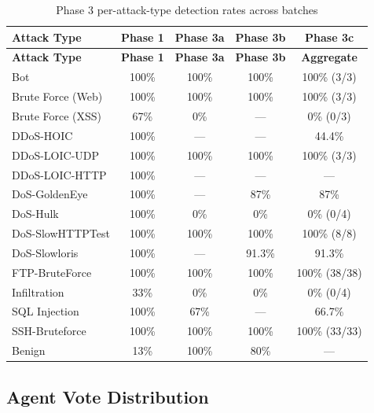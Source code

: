 \documentclass[12pt, a4paper, oneside]{report}
\begin{document}
\begin{table}[H]
\centering
\caption{Phase 3 per-attack-type detection rates across batches}
\label{tab:phase3-perattack}
\small
\begin{tabular}{@{}lcccc@{}}
\toprule
\textbf{Attack Type} & \textbf{Phase 1} & \textbf{Phase 3a} & \textbf{Phase 3b}
  & \textbf{Phase 3c} \\
\midrule
\textbf{Attack Type} & \textbf{Phase 1} & \textbf{Phase 3a} & \textbf{Phase 3b}
  & \textbf{Aggregate} \\
\midrule
Bot                    & 100\% & 100\%  & 100\%  & 100\% (3/3) \\
Brute Force (Web)      & 100\% & 100\%  & 100\%  & 100\% (3/3) \\
Brute Force (XSS)      &  67\% &   0\%  & ---    &   0\% (0/3) \\
DDoS-HOIC              & 100\% &  ---   & ---    & 44.4\% \\
DDoS-LOIC-UDP          & 100\% & 100\%  & 100\%  & 100\% (3/3) \\
DDoS-LOIC-HTTP         & 100\% &  ---   & ---    & --- \\
DoS-GoldenEye          & 100\% &  ---   &  87\%  & 87\% \\
DoS-Hulk               & 100\% &   0\%  &   0\%  &  0\% (0/4) \\
DoS-SlowHTTPTest       & 100\% & 100\%  & 100\%  & 100\% (8/8) \\
DoS-Slowloris          & 100\% &  ---   & 91.3\% & 91.3\% \\
FTP-BruteForce         & 100\% & 100\%  & 100\%  & 100\% (38/38) \\
Infiltration           &  33\% &   0\%  &   0\%  &  0\% (0/4) \\
SQL Injection          & 100\% &  67\%  &  ---   & 66.7\% \\
SSH-Bruteforce         & 100\% & 100\%  & 100\%  & 100\% (33/33) \\
\midrule
Benign                 &  13\% & 100\%  &  80\%  & --- \\
\bottomrule
\end{tabular}
\end{table}


\subsection{Agent Vote Distribution}
\end{document}
